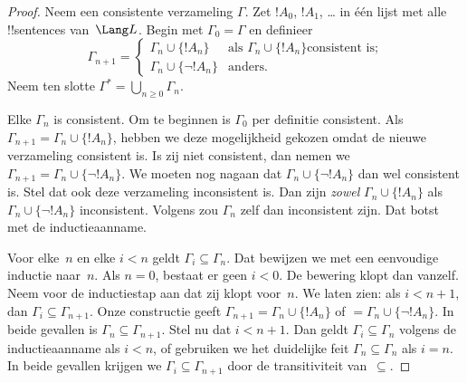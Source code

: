 \documentclass[../../../include/open-logic-section]{subfiles}
\begin{document}
\begin{proof}
Neem een consistente verzameling $\Gamma$. Zet $!A_0$, $!A_1$,
\dots{} in één lijst met alle !!{sentence}s van~$\Lang L$. Begin met
$\Gamma_0 = \Gamma$ en definieer
\[
\Gamma_{n+1} =
\begin{cases}
\Gamma_n \cup \{ !A_n \} & \textrm{als $\Gamma_n \cup \{!A_n\}$
  consistent is;} \\
\Gamma_n \cup \{ \lnot !A_n \} & \textrm{anders.}
\end{cases}
\]
Neem ten slotte $\Gamma^* = \bigcup_{n \geq 0} \Gamma_n$.

Elke $\Gamma_n$ is consistent. Om te beginnen is $\Gamma_0$ per
definitie consistent. Als $\Gamma_{n+1} = \Gamma_n \cup \{!A_n\}$,
hebben we deze mogelijkheid gekozen omdat de nieuwe verzameling
consistent is. Is zij niet consistent, dan nemen we
$\Gamma_{n+1} = \Gamma_n \cup \{\lnot !A_n\}$. We moeten nog nagaan dat
$\Gamma_n \cup \{\lnot !A_n\}$ dan wel consistent is. Stel dat ook deze
verzameling inconsistent is. Dan zijn \emph{zowel}
$\Gamma_n \cup \{!A_n\}$ als $\Gamma_n \cup \{\lnot !A_n\}$
inconsistent. Volgens
zou $\Gamma_n$ zelf dan inconsistent zijn. Dat botst met de
inductieaanname.

Voor elke~$n$ en elke $i < n$ geldt $\Gamma_i \subseteq \Gamma_n$. Dat
bewijzen we met een eenvoudige inductie naar~$n$. Als $n=0$, bestaat er
geen $i < 0$. De bewering klopt dan vanzelf. Neem voor de inductiestap
aan dat zij klopt voor~$n$. We laten zien: als $i < n+1$, dan
$\Gamma_i \subseteq \Gamma_{n+1}$. Onze constructie geeft
$\Gamma_{n+1} = \Gamma_n \cup \{!A_n\}$ of $= \Gamma_n \cup \{\lnot
!A_n\}$. In beide gevallen is $\Gamma_n \subseteq \Gamma_{n+1}$. Stel
nu dat $i < n+1$. Dan geldt $\Gamma_i \subseteq \Gamma_n$ volgens de
inductieaanname als $i < n$, of gebruiken we het duidelijke feit
$\Gamma_n \subseteq \Gamma_n$ als $i = n$. In beide gevallen
krijgen we $\Gamma_i \subseteq \Gamma_{n+1}$ door de transitiviteit
van~$\subseteq$.


\end{proof}
\end{document}
